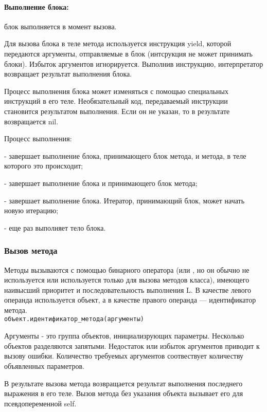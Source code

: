 \paragraph*{Выполнение блока:} блок выполняется в момент вызова.

Для вызова блока в теле метода используется инструкция yield, которой передаются аргументы, отправляемые в блок (интсрукция не может принимать блоки). Избыток аргументов игнорируется. Выполнив инструкцию, интерпретатор возвращает результат выполнения блока.

Процесс выполнения блока может изменяться с помощью специальных инструкций в его теле. Необязательный код, передаваемый инструкции становится результатом выполнения. Если он не указан, то в результате возвращается nil.
\begin{keylist}{Процесс выполнения:}
  
   - завершает выполнение блока, принимающего блок метода, и метода, в теле которого это происходит;
  
   - завершает выполнение блока и принимающего блок метода;
  
   - завершает выполнение блока. Итератор, принимающий блок, может начать новую итерацию;
  
   - еще раз выполняет тело блока.
\end{keylist}

\subsubsection*{Вызов метода}

Методы вызываются с помощью бинарного оператора  (или \mono{::}, но он обычно не используется или используется только для вызова методов класса), имеющего наивысший приоритет и последовательность выполнения L. В качестве левого операнда используется объект, а в качестве правого операнда — идентификатор метода.
\\\verb!объект.идентификатор_метода(аргументы)!

Аргументы - это группа объектов, инициализрующих параметры. Несколько объектов разделяются запятыми. Недостаток или избыток аргументов приводит к вызову ошибки. Количество требуемых аргументов соотвествует количеству объявленных параметров.

В результате вызова метода возвращается результат выполнения последнего выражения в его теле. Вызов метода без указания объекта вызывает его для псевдопеременной self. 

